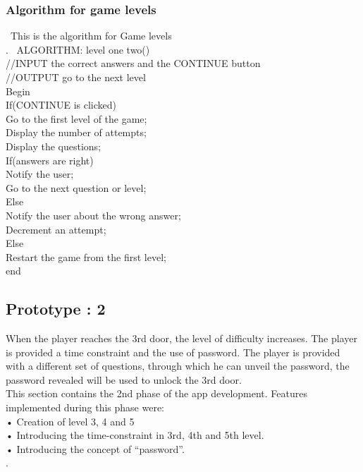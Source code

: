 \subsubsection{Algorithm for game levels }

\ttfamily\ \hspace{1cm}This is the algorithm for Game levels\\
\cite{DBLP:journals/ivc/KadyrovP03}.
\rmfamily\ ALGORITHM: level one two()\\
//INPUT the correct answers and the CONTINUE button\\
//OUTPUT go to the next level\\
Begin\\
If(CONTINUE is clicked)\\
Go to the first level of the game;\\
Display the number of attempts;\\
Display the questions;\\
If(answers are right)\\
Notify the user;\\
Go to the next question or level;\\
Else\\
Notify the user about the wrong answer;\\
Decrement an attempt;\\
Else\\
Restart the game from the first level;\\
end
\rmfamily


\subsection{Prototype : 2}
\hspace{1cm}When the player reaches the 3rd door, the level of difficulty increases. The player is provided a time constraint and the use of password. The player is provided with a different set of questions, through which he can unveil the password, the password revealed will be used to unlock the 3rd door.\\
This section contains the 2nd phase of the app development. Features implemented during this phase were:\\
•	Creation of level 3, 4 and 5\\
•	Introducing the time-constraint in 3rd, 4th and 5th level.\\
•	Introducing the concept of “password”.\\
\cite{DBLP:journals/ivc/KadyrovP03}.\\

